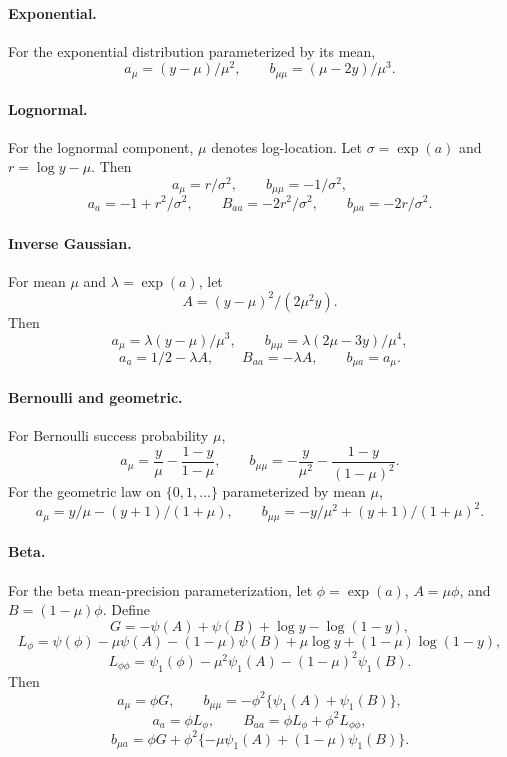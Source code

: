 \paragraph{Exponential.}
For the exponential distribution parameterized by its mean,
\[
    a_\mu=(y-\mu)/\mu^2,\qquad b_{\mu\mu}=(\mu-2y)/\mu^3.
\]

\paragraph{Lognormal.}
For the lognormal component, \(\mu\) denotes log-location.  Let
\(\sigma=\exp(a)\) and \(r=\log y-\mu\).  Then
\[
    a_\mu=r/\sigma^2,\qquad b_{\mu\mu}=-1/\sigma^2,
\]
\[
    a_a=-1+r^2/\sigma^2,\qquad
    B_{aa}=-2r^2/\sigma^2,\qquad
    b_{\mu a}=-2r/\sigma^2.
\]

\paragraph{Inverse Gaussian.}
For mean \(\mu\) and \(\lambda=\exp(a)\), let
\[
    A=(y-\mu)^2/(2\mu^2y).
\]
Then
\[
    a_\mu=\lambda(y-\mu)/\mu^3,\qquad
    b_{\mu\mu}=\lambda(2\mu-3y)/\mu^4,
\]
\[
    a_a=1/2-\lambda A,\qquad
    B_{aa}=-\lambda A,\qquad
    b_{\mu a}=a_\mu.
\]

\paragraph{Bernoulli and geometric.}
For Bernoulli success probability \(\mu\),
\[
    a_\mu=\frac{y}{\mu}-\frac{1-y}{1-\mu},\qquad
    b_{\mu\mu}=-\frac{y}{\mu^2}-\frac{1-y}{(1-\mu)^2}.
\]
For the geometric law on \(\{0,1,\ldots\}\) parameterized by mean \(\mu\),
\[
    a_\mu=y/\mu-(y+1)/(1+\mu),\qquad
    b_{\mu\mu}=-y/\mu^2+(y+1)/(1+\mu)^2.
\]

\paragraph{Beta.}
For the beta mean-precision parameterization, let
\(\phi=\exp(a)\), \(A=\mu\phi\), and \(B=(1-\mu)\phi\).  Define
\[
    G=-\psi(A)+\psi(B)+\log y-\log(1-y),
\]
\[
    L_\phi=
    \psi(\phi)-\mu\psi(A)-(1-\mu)\psi(B)
    +\mu\log y+(1-\mu)\log(1-y),
\]
\[
    L_{\phi\phi}=
    \psi_1(\phi)-\mu^2\psi_1(A)-(1-\mu)^2\psi_1(B).
\]
Then
\[
    a_\mu=\phi G,\qquad
    b_{\mu\mu}=-\phi^2\{\psi_1(A)+\psi_1(B)\},
\]
\[
    a_a=\phi L_\phi,\qquad
    B_{aa}=\phi L_\phi+\phi^2L_{\phi\phi},
\]
\[
    b_{\mu a}=
    \phi G+\phi^2\{-\mu\psi_1(A)+(1-\mu)\psi_1(B)\}.
\]

